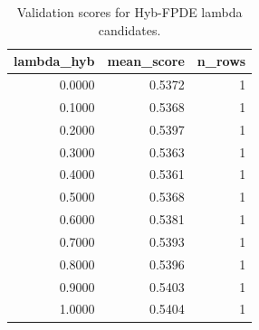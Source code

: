 \begin{table}[t]
\caption{Validation scores for Hyb-FPDE lambda candidates.}
\label{tab:lambda_distribution_computed}
\centering
\begin{tabular}{rrr}
\toprule
lambda\_hyb & mean\_score & n\_rows \\
\midrule
0.0000 & 0.5372 & 1 \\
0.1000 & 0.5368 & 1 \\
0.2000 & 0.5397 & 1 \\
0.3000 & 0.5363 & 1 \\
0.4000 & 0.5361 & 1 \\
0.5000 & 0.5368 & 1 \\
0.6000 & 0.5381 & 1 \\
0.7000 & 0.5393 & 1 \\
0.8000 & 0.5396 & 1 \\
0.9000 & 0.5403 & 1 \\
1.0000 & 0.5404 & 1 \\
\bottomrule
\end{tabular}

\end{table}
